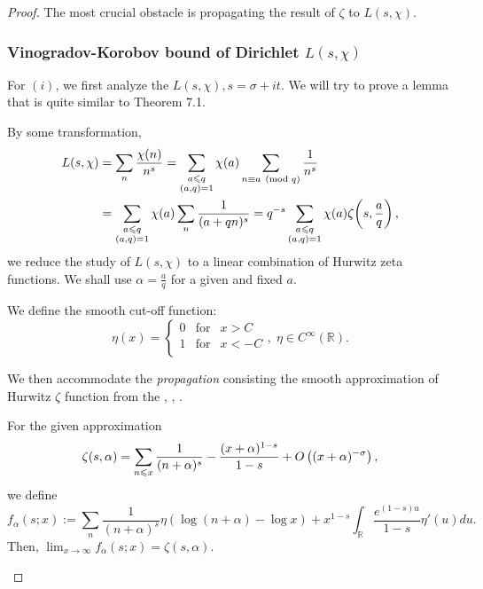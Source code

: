 \begin{proof}
The most crucial obstacle is propagating the result of $\zeta$ to $L(s, \chi).$

\subsubsection{Vinogradov-Korobov bound of Dirichlet $L(s, \chi)$}
For $(i)$, we first analyze the $L(s, \chi), s = \sigma + it$. We will try to prove a lemma that is quite similar to Theorem 7.1. 

By some transformation, 
\begin{align}
    L(s, \chi) &= \sum_n \frac{\chi(n)}{n^s} = \sum_{\substack{a \leqslant q \\ (a, q) =1}} \chi(a) \sum_{n \equiv a \pmod{q}} \frac{1}{n^s} \\
    &= \sum_{\substack{a \leqslant q \\ (a, q) =1}} \chi(a) \sum_{n} \frac{1}{(a+qn)^s} = q^{-s} \sum_{\substack{a \leqslant q \\ (a, q) =1}} \chi(a) \zeta\! \left( s,\frac{a}{q} \right),
\end{align}
we reduce the study of $L(s,\chi)$ to a linear combination of Hurwitz zeta functions. We shall use $\alpha = \frac{a}{q}$ for a given and fixed $a$.

We define the smooth cut-off function:
\begin{equation*}
    \eta(x) = \left\{ \begin{array}{rcl}
    0 & \mbox{for} & x > C \\
    1 & \mbox{for} & x < -C \\
\end{array} \right., \; \eta \in C^\infty(\mathbb{R}). 
\end{equation*}

We then accommodate the \emph{propagation} consisting the smooth approximation of Hurwitz $\zeta$ function from the \cite[Exercise 32]{Tao254ASupp3}, \cite[Lemma 33]{Tao254ASupp3}, \cite[Exercise 34]{Tao254ASupp3}.

\begin{lemma}
    For the given approximation
    \begin{equation}
        \zeta(s, \alpha) = \sum_{n \leqslant x} \frac{1}{(n+\alpha)^s} - \frac{(x+\alpha)^{1-s}}{1-s} + O\left((x+\alpha)^{-\sigma}\right),
    \end{equation} 
    we define $$f_\alpha(s; x) := \sum_n \frac{1}{(n+\alpha)^s} \eta(\log (n+\alpha) - \log x) + x^{1-s}\int_{\mathbb{R}} \frac{e^{(1-s)u}}{1-s} \eta'(u) du.$$ 
    Then, $\lim_{x \to \infty} f_\alpha(s; x) = \zeta(s, \alpha).$


\end{lemma}
\end{proof}
